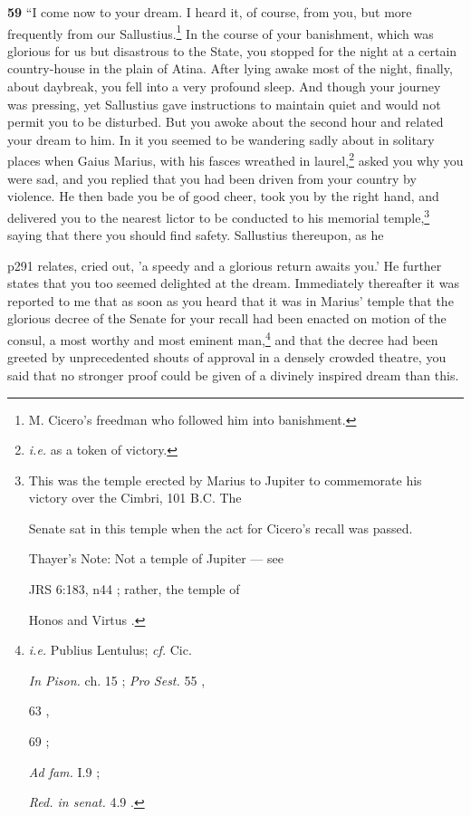 \textbf{59} ``I come now to your dream. I heard it, of course, from you, but more frequently from our Sallustius.\texthebrew{}\footnote{M. Cicero's freedman who followed him into banishment.

} In the course of your banishment, which was glorious for us but disastrous to the State, you stopped for the night at a certain country-house in the plain of Atina. After lying awake most of the night, finally, about daybreak, you fell into a very profound sleep. And though your journey was pressing, yet Sallustius gave instructions to maintain quiet and would not permit you to be disturbed. But you awoke about the second hour and related your dream to him. In it you seemed to be wandering sadly about in solitary places when Gaius Marius, with his fasces wreathed in laurel,\texthebrew{}\footnote{\emph{i.e.} as a token of victory.

} asked you why you were sad, and you replied that you had been driven from your country by violence. He then bade you be of good cheer, took you by the right hand, and delivered you to the nearest lictor to be conducted to his memorial temple,\texthebrew{}\footnote{This was the temple erected by Marius to Jupiter to commemorate his victory over the Cimbri, 101 B.C. The

Senate sat in this temple when the act for Cicero's recall was passed.

Thayer's Note: Not a temple of Jupiter \texthebrew{—} see

JRS 6:183, n44 ; rather, the temple of

Honos and Virtus .

} saying that there you should find safety. Sallustius thereupon, as he

p291 relates, cried out, 'a speedy and a glorious return awaits you.' He further states that you too seemed delighted at the dream. Immediately thereafter it was reported to me that as soon as you heard that it was in Marius' temple that the glorious decree of the Senate for your recall had been enacted on motion of the consul, a most worthy and most eminent man,\texthebrew{}\footnote{\emph{i.e.} Publius Lentulus; \emph{cf.} Cic.

\emph{In Pison.} ch. 15 ; \emph{Pro Sest.} 55 ,

63 ,

69 ;

\emph{Ad fam.} I.9 ;

\emph{Red. in senat.} 4.9 .

} and that the decree had been greeted by unprecedented shouts of approval in a densely crowded theatre, you said that no stronger proof could be given of a divinely inspired dream than this.


